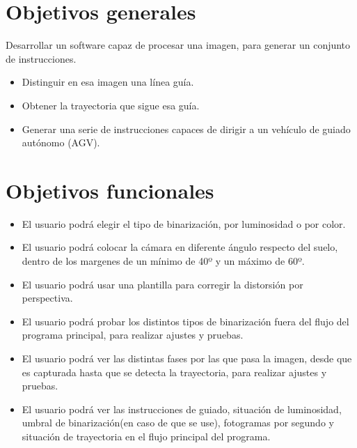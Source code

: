 
\section{Objetivos generales}
Desarrollar un software capaz de procesar una imagen, para generar un conjunto de instrucciones.

\begin{itemize}
	\item Distinguir en esa imagen una línea guía.
	
	\item Obtener la trayectoria que sigue esa guía.
	
	\item Generar una serie de instrucciones capaces de dirigir a un vehículo de guiado autónomo (AGV).
\end{itemize} 

\section{Objetivos funcionales}
\begin{itemize}
	\item El usuario podrá elegir el tipo de binarización, por luminosidad o por color.
	
	\item El usuario podrá colocar la cámara en diferente ángulo respecto del suelo, dentro de los margenes de un mínimo de 40º y un máximo de 60º.
	
	\item El usuario podrá usar una plantilla para corregir la distorsión por perspectiva.
	
	\item El usuario podrá probar los distintos tipos de binarización fuera del flujo del programa principal, para realizar ajustes y pruebas.
	
	\item El usuario podrá ver las distintas fases por las que pasa la imagen, desde que es capturada hasta que se detecta la trayectoria, para realizar ajustes y pruebas.
	
	\item El usuario podrá ver las instrucciones de guiado, situación de luminosidad, umbral de binarización(en caso de que se use), fotogramas por segundo y situación de trayectoria en el flujo principal del programa.
	
\end{itemize}


